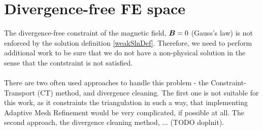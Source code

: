 \section{Divergence-free FE space}
The divergence-free constraint of the magnetic field, $\mbox{\boldmath $B$} = 0$ (Gauss's law) is not enforced by the solution definition \ref{weakSlnDef}. Therefore, we need to perform additional work to be sure that we do not have a non-physical solution in the sense that the contstraint is not satisfied.
\paragraph{}
There are two often used approaches to handle this problem - the Constraint-Transport (CT) method, and divergence cleaning. The first one is not suitable for this work, as it constraints the triangulation in such a way, that implementing Adaptive Mesh Refinement would be very complicated, if possible at all. The second approach, the divergence cleaning method, ... (TODO doplnit).

